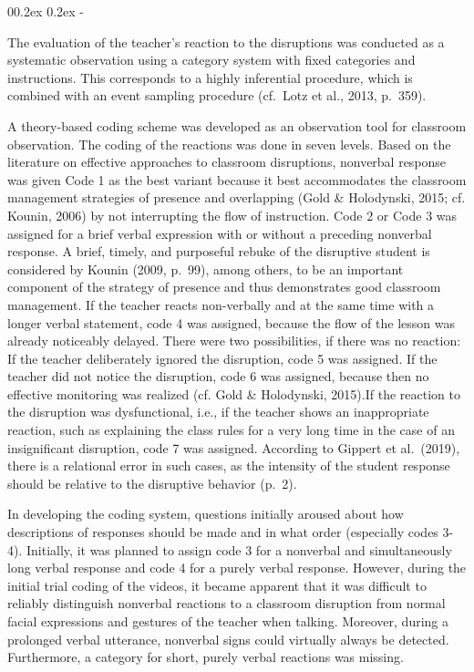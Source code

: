 \documentclass[
  man]{apa6}
\makeatletter
\let\oldsubparagraph\subparagraph
\renewcommand{\subparagraph}[1]{\oldsubparagraph{#1}\mbox{}}
\renewcommand{\subparagraph}[1]{\@startsection{subparagraph}{5}{1em}%
  {0\baselineskip \@plus 0.2ex \@minus 0.2ex}%
  {-\z@\relax}%
  {\normalfont\normalsize\itshape\hspace{\parindent}{#1}\textit{\addperi}}{\relax}}
\makeatother
\begin{document}
\subparagraph{Teachers' Reaction to disruptions}\label{teachers-reaction-to-disruptions}

The evaluation of the teacher's reaction to the disruptions was conducted as a systematic observation using a category system with fixed categories and instructions. This corresponds to a highly inferential procedure, which is combined with an event sampling procedure (cf.~Lotz et al., 2013, p.~359).

A theory-based coding scheme was developed as an observation tool for classroom observation. The coding of the reactions was done in seven levels. Based on the literature on effective approaches to classroom disruptions, nonverbal response was given Code 1 as the best variant because it best accommodates the classroom management strategies of presence and overlapping (Gold \& Holodynski, 2015; cf. Kounin, 2006) by not interrupting the flow of instruction. Code 2 or Code 3 was assigned for a brief verbal expression with or without a preceding nonverbal response. A brief, timely, and purposeful rebuke of the disruptive student is considered by Kounin (2009, p.~99), among others, to be an important component of the strategy of presence and thus demonstrates good classroom management. If the teacher reacts non-verbally and at the same time with a longer verbal statement, code 4 was assigned, because the flow of the lesson was already noticeably delayed. There were two possibilities, if there was no reaction: If the teacher deliberately ignored the disruption, code 5 was assigned. If the teacher did not notice the disruption, code 6 was assigned, because then no effective monitoring was realized (cf. Gold \& Holodynski, 2015).If the reaction to the disruption was dysfunctional, i.e., if the teacher shows an inappropriate reaction, such as explaining the class rules for a very long time in the case of an insignificant disruption, code 7 was assigned. According to Gippert et al.~(2019), there is a relational error in such cases, as the intensity of the student response should be relative to the disruptive behavior (p.~2).

In developing the coding system, questions initially aroused about how descriptions of responses should be made and in what order (especially codes 3-4). Initially, it was planned to assign code 3 for a nonverbal and simultaneously long verbal response and code 4 for a purely verbal response. However, during the initial trial coding of the videos, it became apparent that it was difficult to reliably distinguish nonverbal reactions to a classroom disruption from normal facial expressions and gestures of the teacher when talking. Moreover, during a prolonged verbal utterance, nonverbal signs could virtually always be detected. Furthermore, a category for short, purely verbal reactions was missing.
\end{document}
